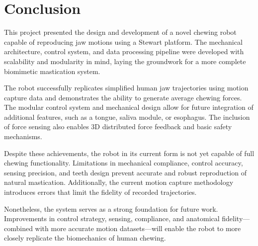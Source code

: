 \section{Conclusion}

This project presented the design and development of a novel chewing robot capable of reproducing jaw motions using a Stewart platform. 
The mechanical architecture, control system, and data processing pipeline were developed with scalability and modularity in mind, laying the 
groundwork for a more complete biomimetic mastication system.

The robot successfully replicates simplified human jaw trajectories using motion capture data and demonstrates the ability to generate average chewing forces. 
The modular control system and mechanical design allow for future integration of additional features, such as a tongue, saliva 
module, or esophagus. The inclusion of force sensing also enables 3D distributed force feedback and basic safety mechanisms.

Despite these achievements, the robot in its current form is not yet capable of full chewing functionality. Limitations in mechanical compliance, 
control accuracy, sensing precision, and teeth design prevent accurate and robust reproduction of natural mastication. Additionally, the current 
motion capture methodology introduces errors that limit the fidelity of recorded trajectories.

Nonetheless, the system serves as a strong foundation for future work. Improvements in control strategy, sensing, compliance, and anatomical 
fidelity—combined with more accurate motion datasets—will enable the robot to more closely replicate the biomechanics of human chewing. 
